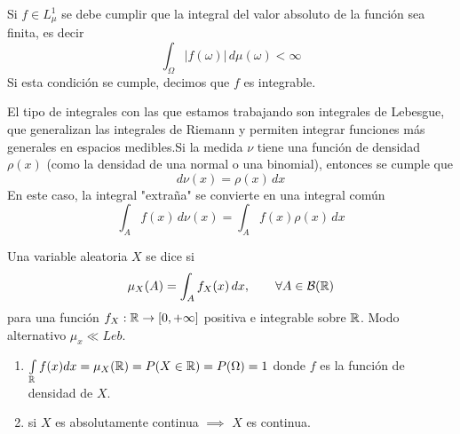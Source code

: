 \begin{observacion}
    Si $f\in L_{\mu}^1$ se debe cumplir que la integral del valor absoluto de la función sea finita, es decir 
    $$\int_{\Omega} |f(\omega)| \, d\mu(\omega) < \infty$$
    Si esta condición se cumple, decimos que $f$ es integrable.
\end{observacion}

\begin{observacion}
    El tipo de integrales con las que estamos trabajando son integrales de Lebesgue, que generalizan las integrales de Riemann y permiten integrar funciones más generales en espacios medibles.Si la medida $\nu$ tiene una función de densidad $\rho(x)$ (como la densidad de una normal o una binomial), entonces se cumple que
    $$d\nu(x) = \rho(x) \, dx$$
    En este caso, la integral "extraña" se convierte en una integral común
    $$\int_A f(x) \, d\nu(x) = \int_A f(x) \rho(x) \, dx$$
\end{observacion}

\begin{definicion}
    Una variable aleatoria $X$ se dice  si 
    \begin{equation*}
        \mu_X(A)=\int_A f_X(x) \, dx, \qquad \forall A\in \mathcal{B}(\mathbb{R})
    \end{equation*}
    para una función $f_X:\mathbb{R} \to [0, +\infty]$ positiva e integrable sobre $\mathbb{R}$. Modo alternativo $\mu_x \ll Leb$.
\end{definicion}

\begin{observacion}
    \begin{enumerate}[label=\arabic*)]
        \item $\int\limits_{\mathbb{R}} f(x)dx=\mu_X(\mathbb{R})=P(X\in \mathbb{R})=P(\Omega)=1$ donde $f$ es la función de densidad de $X$.
        \item si $X$ es absolutamente continua $\implies$ $X$ es continua. 
    \end{enumerate}
\end{observacion}

